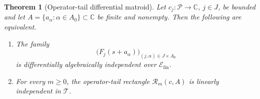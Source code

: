 \documentclass[11pt]{article}
\newtheorem{theorem}{Theorem}[section]
\theoremstyle{definition}
\theoremstyle{remark}
\newcommand{\C}{\mathbb C}
\newcommand{\cP}{\mathcal P}
\newcommand{\cT}{\mathcal T}
\begin{document}
\begin{theorem}[Operator-tail differential matroid]\label{thm:operator-tail}
Let \(c_j:\cP\to\C\), \(j\in J\), be bounded and let
\(A=\{a_\alpha:\alpha\in A_0\}\subset\C\) be finite and nonempty.  Then the following
are equivalent.
\begin{enumerate}[label=(\roman*),leftmargin=2.2em]
  \item The family
  \[
    \bigl(F_j(s+a_\alpha)\bigr)_{(j,\alpha)\in J\times A_0}
  \]
  is differentially algebraically independent over \(\mathscr E_{\mathrm{fin}}\).
  \item For every \(m\geq0\), the operator-tail rectangle
  \(\mathscr R_m(c,A)\) is linearly independent in \(\cT\).
\end{enumerate}
\end{theorem}
\end{document}
